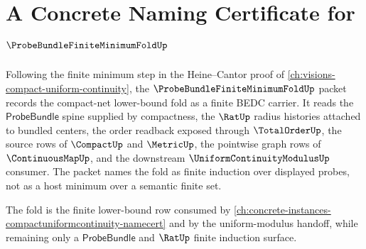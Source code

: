\chapter{A Concrete Naming Certificate for $\ProbeBundleFiniteMinimumFoldUp$}
\label{ch:concrete-instances-probe-bundle-finite-minimum-fold-namecert}

Following the finite minimum step in the Heine--Cantor proof of \autoref{ch:visions-compact-uniform-continuity}, the $\ProbeBundleFiniteMinimumFoldUp$ packet records the compact-net lower-bound fold as a finite BEDC carrier. It reads the $\mathsf{ProbeBundle}$ spine supplied by compactness, the $\RatUp$ radius histories attached to bundled centers, the order readback exposed through $\TotalOrderUp$, the source rows of $\CompactUp$ and $\MetricUp$, the pointwise graph rows of $\ContinuousMapUp$, and the downstream $\UniformContinuityModulusUp$ consumer. The packet names the fold as finite induction over displayed probes, not as a host minimum over a semantic finite set.

The fold is the finite lower-bound row consumed by \autoref{ch:concrete-instances-compactuniformcontinuity-namecert} and by the uniform-modulus handoff, while remaining only a $\mathsf{ProbeBundle}$ and $\RatUp$ finite induction surface.

